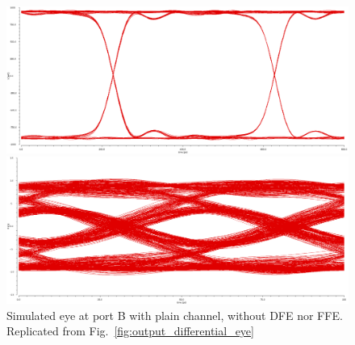 \documentclass{book}  %
\begin{document}
\begin{paper}
\label{sec:result}
\begin{figure}[htbp!]
	\centering	
	\begin{minipage}[tb]{0.5\textwidth}
		\centering	
		\includegraphics[height=0.15\textheight]{./img/channel_response_eye_diagram/output_differential_eye_3gbp.png}
	\end{minipage}%
	\begin{minipage}[tb]{0.5\textwidth}
		\centering	
		\includegraphics[height=0.15\textheight]{./img/channel_response_eye_diagram/output_differential_eye_20gbp.png}
	\end{minipage}
	\caption{Simulated eye at port B with plain channel, without DFE nor FFE. Replicated from Fig.~\ref{fig:output_differential_eye}}
	\label{fig:eye_bare_channel}
\end{figure}


\end{paper}
\end{document}
